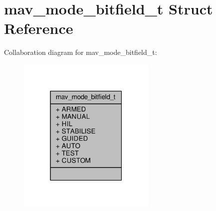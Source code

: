 \hypertarget{structmav__mode__bitfield__t}{\section{mav\+\_\+mode\+\_\+bitfield\+\_\+t Struct Reference}
\label{structmav__mode__bitfield__t}
}


Collaboration diagram for mav\+\_\+mode\+\_\+bitfield\+\_\+t\+:
\nopagebreak
\begin{figure}[H]
\begin{center}
\leavevmode
\includegraphics[width=187pt]{structmav__mode__bitfield__t__coll__graph}
\end{center}
\end{figure}

